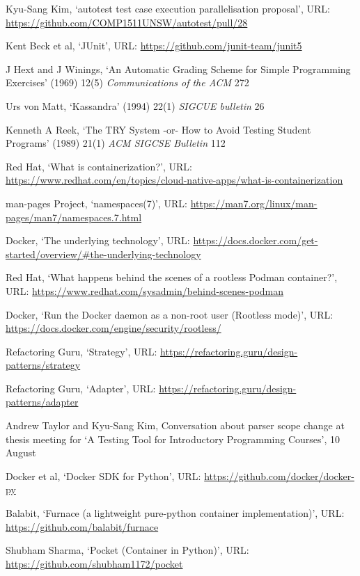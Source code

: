 \documentclass[hidelinks]{report}
\begin{document}
\begin{thebibliography}{99}
Kyu-Sang Kim, ‘autotest test case execution parallelisation proposal’, URL: \url{https://github.com/COMP1511UNSW/autotest/pull/28}

Kent Beck et al, ‘JUnit’, URL: \url{https://github.com/junit-team/junit5}

J Hext and J Winings, ‘An Automatic Grading Scheme for Simple Programming Exercises’ (1969) 12(5) \textit{Communications of the ACM} 272

Urs von Matt, ‘Kassandra’ (1994) 22(1) \textit{SIGCUE bulletin} 26

Kenneth A Reek, ‘The TRY System -or- How to Avoid Testing Student Programs’ (1989) 21(1) \textit{ACM SIGCSE Bulletin} 112

Red Hat, ‘What is containerization?’, URL: \url{https://www.redhat.com/en/topics/cloud-native-apps/what-is-containerization}

man-pages Project, ‘namespaces(7)’, URL: \url{https://man7.org/linux/man-pages/man7/namespaces.7.html}

Docker, ‘The underlying technology’, URL: \url{https://docs.docker.com/get-started/overview/#the-underlying-technology}

Red Hat, ‘What happens behind the scenes of a rootless Podman container?’, URL: \url{https://www.redhat.com/sysadmin/behind-scenes-podman}

Docker, ‘Run the Docker daemon as a non-root user (Rootless mode)’, URL: \url{https://docs.docker.com/engine/security/rootless/}

Refactoring Guru, ‘Strategy’, URL: \url{https://refactoring.guru/design-patterns/strategy}

Refactoring Guru, ‘Adapter’, URL: \url{https://refactoring.guru/design-patterns/adapter}

Andrew Taylor and Kyu-Sang Kim, Conversation about parser scope change at thesis meeting for ‘A Testing Tool for Introductory Programming Courses’, 10 August

Docker et al, ‘Docker SDK for Python’, URL: \url{https://github.com/docker/docker-py}

Balabit, ‘Furnace (a lightweight pure-python container implementation)’, URL: \url{https://github.com/balabit/furnace}

Shubham Sharma, ‘Pocket (Container in Python)’, URL: \url{https://github.com/shubham1172/pocket}

\end{thebibliography}
\end{document}
